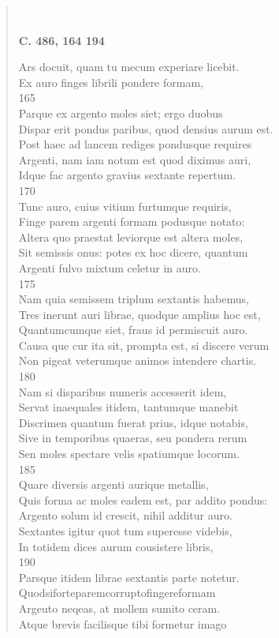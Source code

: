 \documentclass[11pt, a4paper]{report}
\begin{document}
\begin{verse}
        ﻿\pagebreak 
    \begin{center} \textbf{C. 486, 164 194} \end{center} \marginpar{[36]} Ars docuit, quam tu mecum experiare licebit. \\ Ex auro finges librili pondere formam, \\ 165 \\ Parque ex argento moles siet; ergo duobus \\ Dispar erit pondus paribus, quod densius aurum est. \\ Post haec ad lancem rediges pondusque requires \\ Argenti, nam iam notum est quod diximus auri, \\ Idque fac argento gravius sextante repertum. \\ 170 \\ Tunc auro, cuius vitium furtumque requiris, \\ Finge parem argenti formam podusque notato: \\ Altera quo praestat leviorque est altera moles, \\ Sit semissis onus: potes ex hoc dicere, quantum \\ Argenti fulvo mixtum celetur in auro. \\ 175 \\ Nam quia semissem triplum sextantis habemus, \\ Tres inerunt auri librae, quodque amplius hoc est, \\ Quantumcumque siet, fraus id permiscuit auro. \\ Causa \lbrack que \rbrack  cur ita sit, prompta est, si discere verum \\ Non pigeat veterumque animos intendere chartis. \\ 180 \\ Nam si disparibus numeris accesserit idem, \\ Servat inaequales itidem, tantumque manebit \\ Discrimen quantum fuerat prius, idque notabis, \\ Sive in temporibus quaeras, seu pondera rerum \\ Sen moles spectare velis spatiumque locorum. \\ 185 \\ Quare diversis argenti aurique metallis, \\ Quis forma ac moles eadem est, par addito pondus: \\ Argento solum id crescit, nihil additur auro. \\ Sextantes igitur quot tum superesse videbis, \\ In totidem dices aurum cousistere libris, \\ 190 \\ Parsque itidem librae sextantis parte notetur. \\ Quodsiforteparemcorruptofingereformam \\ Argeuto neqeas, at mollem sumito ceram. \\ Atque brevis facilisque tibi formetur imago \\ 

\end{verse}
\end{document}
